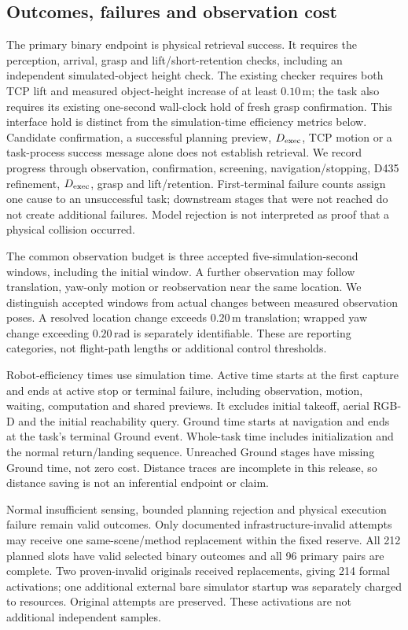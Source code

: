 \subsection{Outcomes, failures and observation cost}
\label{sec:metrics}
The primary binary endpoint is physical retrieval success. It requires the
perception, arrival, grasp and lift/short-retention checks, including an
independent simulated-object height check. The existing checker requires both
TCP lift and measured object-height increase of at least $0.10\,\mathrm{m}$;
the task also requires its existing one-second wall-clock hold of fresh grasp
confirmation. This interface hold is distinct from the simulation-time efficiency
metrics below. Candidate confirmation, a successful
planning preview, $D_{\mathrm{exec}}$, TCP motion or a task-process success message alone
does not establish retrieval. We record progress through observation,
confirmation, screening, navigation/stopping, D435 refinement, $D_{\mathrm{exec}}$, grasp
and lift/retention. First-terminal failure counts assign one cause to an
unsuccessful task; downstream stages that were not reached do not create
additional failures. Model rejection is not interpreted as proof that a
physical collision occurred.

The common observation budget is three accepted five-simulation-second windows,
including the initial window. A further observation may follow translation,
yaw-only motion or reobservation near the same location. We distinguish accepted
windows from actual changes between measured observation poses. A resolved
location change exceeds $0.20\,\mathrm{m}$ translation; wrapped yaw change
exceeding $0.20\,\mathrm{rad}$ is separately identifiable. These are reporting
categories, not flight-path lengths or additional control thresholds.

Robot-efficiency times use simulation time. Active time starts at the first
capture and ends at active stop or terminal failure, including observation,
motion, waiting, computation and shared previews. It excludes initial takeoff,
aerial RGB-D and the initial reachability query. Ground time starts at navigation
and ends at the task's terminal Ground event. Whole-task time includes
initialization and the normal return/landing sequence. Unreached Ground stages
have missing Ground time, not zero cost. Distance traces are incomplete in this
release, so distance saving is not an inferential endpoint or claim.

Normal insufficient sensing, bounded planning rejection and physical execution
failure remain valid outcomes. Only documented infrastructure-invalid attempts
may receive one same-scene/method replacement within the fixed reserve. All
212 planned slots have valid selected binary outcomes and all 96 primary pairs
are complete. Two proven-invalid originals received replacements, giving 214
formal activations; one additional external bare simulator startup was separately
charged to resources. Original attempts are preserved. These activations are not
additional independent samples.

